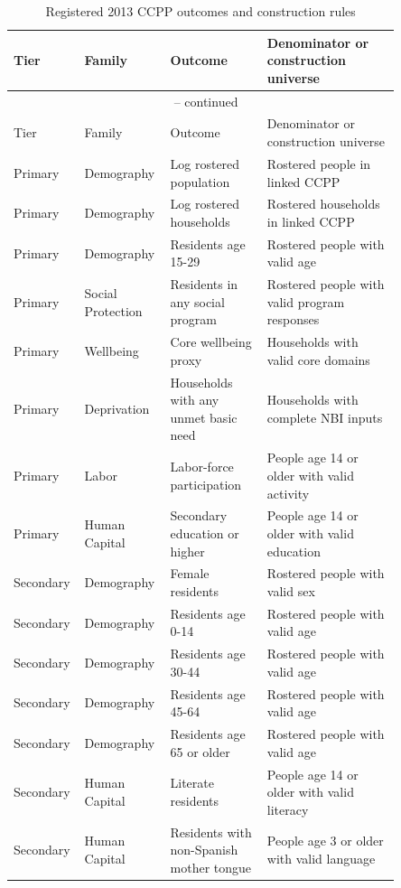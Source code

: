 \begingroup
\small
\begin{longtable}{p{0.10\linewidth}p{0.18\linewidth}p{0.24\linewidth}p{0.33\linewidth}}
\caption{Registered 2013 CCPP outcomes and construction rules}
\label{tab:rd_outcome_registry_2013_ccpp} \\
\toprule
Tier & Family & Outcome & Denominator or construction universe \\
\midrule
\endfirsthead
\multicolumn{4}{c}{\tablename\ \thetable{} -- continued} \\
\toprule
Tier & Family & Outcome & Denominator or construction universe \\
\midrule
\endhead
Primary & Demography & Log rostered population & Rostered people in linked CCPP \\
Primary & Demography & Log rostered households & Rostered households in linked CCPP \\
Primary & Demography & Residents age 15-29 & Rostered people with valid age \\
Primary & Social Protection & Residents in any social program & Rostered people with valid program responses \\
Primary & Wellbeing & Core wellbeing proxy & Households with valid core domains \\
Primary & Deprivation & Households with any unmet basic need & Households with complete NBI inputs \\
Primary & Labor & Labor-force participation & People age 14 or older with valid activity \\
Primary & Human Capital & Secondary education or higher & People age 14 or older with valid education \\
Secondary & Demography & Female residents & Rostered people with valid sex \\
Secondary & Demography & Residents age 0-14 & Rostered people with valid age \\
Secondary & Demography & Residents age 30-44 & Rostered people with valid age \\
Secondary & Demography & Residents age 45-64 & Rostered people with valid age \\
Secondary & Demography & Residents age 65 or older & Rostered people with valid age \\
Secondary & Human Capital & Literate residents & People age 14 or older with valid literacy \\
Secondary & Human Capital & Residents with non-Spanish mother tongue & People age 3 or older with valid language \\

\end{longtable}
